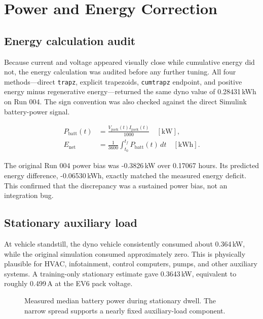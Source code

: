 \documentclass[11pt,letterpaper]{article}
\newcommand{\SI}[2]{#1\,#2}
\newcommand{\si}[1]{\mathrm{#1}}
\begin{document}
\section{Power and Energy Correction}

\subsection{Energy calculation audit}

Because current and voltage appeared visually close while cumulative energy did
not, the energy calculation was audited before any further tuning. All four
methods---direct \texttt{trapz}, explicit trapezoids, \texttt{cumtrapz}
endpoint, and positive energy minus regenerative energy---returned the same
dyno value of \SI{0.28431}{kWh} on Run 004. The sign convention was also checked
against the direct Simulink battery-power signal.

\begin{align}
P_{\mathrm{batt}}(t) &= \frac{V_{\mathrm{pack}}(t) I_{\mathrm{pack}}(t)}{1000}
\quad [\si{kW}], \\
E_{\mathrm{net}} &= \frac{1}{3600}\int_{t_0}^{t_f}P_{\mathrm{batt}}(t)\,dt
\quad [\si{kWh}].
\end{align}

The original Run 004 power bias was \SI{-0.3826}{kW} over 0.17067 hours. Its
predicted energy difference, \SI{-0.06530}{kWh}, exactly matched the measured
energy deficit. This confirmed that the discrepancy was a sustained power bias,
not an integration bug.

\subsection{Stationary auxiliary load}

At vehicle standstill, the dyno vehicle consistently consumed about
\SI{0.364}{kW}, while the original simulation consumed approximately zero.
This is physically plausible for HVAC, infotainment, control computers, pumps,
and other auxiliary systems. A training-only stationary estimate gave
\SI{0.3643}{kW}, equivalent to roughly \SI{0.499}{A} at the EV6 pack voltage.

\begin{figure}[!htbp]
\centering
{}
\caption{Measured median battery power during stationary dwell. The narrow spread supports a nearly fixed auxiliary-load component.}
\end{figure}
\end{document}
